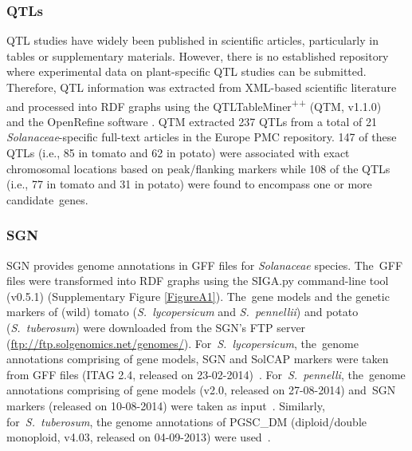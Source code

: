 \documentclass[applsci,article,accept,moreauthors,pdftex]{Definitions/mdpi}
\begin{document}
{\subsubsection{QTLs}
QTL studies have widely been published in scientific articles, particularly in tables or supplementary materials. However, there is no established repository where experimental data on plant-specific QTL studies can be submitted.
Therefore, QTL information was extracted %
from XML-based %
scientific literature and processed into RDF graphs \cite{QTLs} %
using the QTLTableMiner\textsuperscript{++} (QTM, v1.1.0)~\cite{singh2018qtltableminer++, QTM}
and the OpenRefine software \cite{OpenRefine}.
QTM extracted 237 QTLs from a total of 21 \textit{Solanaceae}-specific full-text articles in the Europe PMC repository. %
147 of these QTLs (i.e., 85 in tomato and 62 in potato) were associated with exact chromosomal locations based on peak/flanking markers while 108 of the QTLs (i.e., 77 in tomato and 31 in potato) were found to encompass one or more candidate~genes. %

\subsubsection{SGN}
SGN provides genome annotations in GFF files for \textit{Solanaceae} %
species. The~GFF files were transformed into RDF graphs \cite{GAs} %
using the SIGA.py command-line tool (v0.5.1) \cite{SIGA} %
(Supplementary Figure \ref{FigureA1}). %
 The~gene models and the genetic markers of (wild) tomato (\textit{S.~lycopersicum} and \textit{S.~pennellii}) and potato (\textit{S.~tuberosum}) were downloaded from the SGN’s FTP server (\url{ftp://ftp.solgenomics.net/genomes/}).
 For~\textit{S.~lycopersicum}, the~genome annotations comprising of gene models, SGN and SolCAP markers %
 were taken from GFF files (ITAG 2.4, released on 23-02-2014)~\cite{SGN:SL}. %
 For~\textit{S.~pennelli}, the~genome annotations comprising of gene models (v2.0, released on 27-08-2014) %
 and~SGN markers (released on 10-08-2014) %
 were taken as input~\cite{SGN:SP}. %
 Similarly, for~\textit{S.~tuberosum}, the genome annotations %
 of PGSC{\_}DM (diploid/double monoploid, v4.03, released on 04-09-2013) %
 were used~\cite{SGN:ST}. %

}
\end{document}

